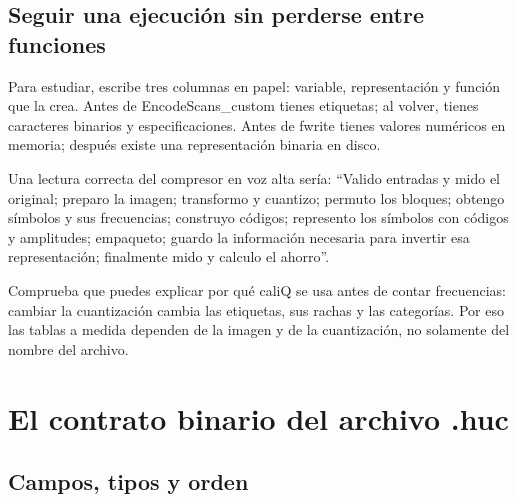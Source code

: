 \documentclass[11pt,a4paper,oneside]{report}
\begin{document}
\section{Seguir una ejecución sin perderse entre funciones}

Para estudiar, escribe tres columnas en papel: variable, representación y
función que la crea. Antes de EncodeScans\_custom tienes etiquetas; al volver,
tienes caracteres binarios y especificaciones. Antes de fwrite tienes valores
numéricos en memoria; después existe una representación binaria en disco.

Una lectura correcta del compresor en voz alta sería: ``Valido entradas y
mido el original; preparo la imagen; transformo y cuantizo; permuto los bloques;
obtengo símbolos y sus frecuencias; construyo códigos; represento los símbolos
con códigos y amplitudes; empaqueto; guardo la información necesaria para
invertir esa representación; finalmente mido y calculo el ahorro''.

Comprueba que puedes explicar por qué caliQ se usa antes de contar frecuencias:
cambiar la cuantización cambia las etiquetas, sus rachas y las categorías.
Por eso las tablas a medida dependen de la imagen y de la cuantización,
no solamente del nombre del archivo.

\chapter{El contrato binario del archivo .huc}
\section{Campos, tipos y orden}
\end{document}
